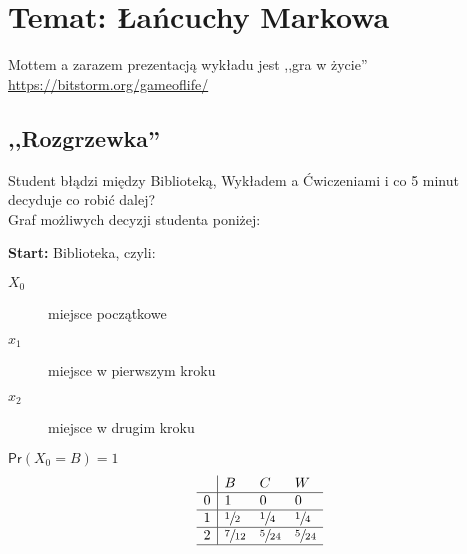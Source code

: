 \section[Wykład 7: 20-IV-2017 - Temat: Łańcuchy Markowa]{Temat: Łańcuchy Markowa}
Mottem a zarazem prezentacją wykładu jest ,,gra w życie'' \url{https://bitstorm.org/gameoflife/}

\subsection{,,Rozgrzewka''}
\begin{example*}\label{exa:student}
Student błądzi między Biblioteką, Wykładem a Ćwiczeniami i co 5 minut decyduje co robić dalej?\\
Graf możliwych decyzji studenta poniżej:
\begin{figure}[H]
\centering
{}
\end{figure}
\textbf{Start:} Biblioteka, czyli:
\begin{description}
\item[$X_0$] miejsce początkowe
\item[$x_1$] miejsce w pierwszym kroku
\item[$x_2$] miejsce w drugim kroku
\end{description}
$\mathsf{Pr}(X_0=B)=1$
$$\begin{array}{l|lll}
 & B & C & W \\ \hline
0 & 1 & 0 & 0 \\ \hline
1 & \sfrac{1}{2} & \sfrac{1}{4} & \sfrac{1}{4} \\ \hline
2 & \sfrac{7}{12} & \sfrac{5}{24} & \sfrac{5}{24} \\ \hline
\end{array}$$

\end{example*}
